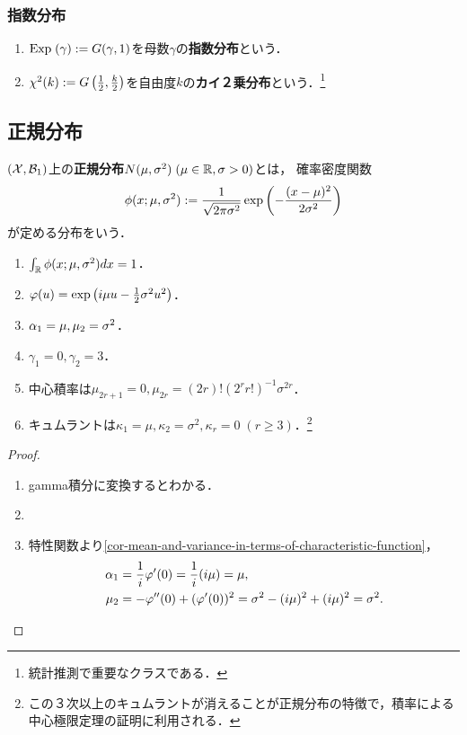 \documentclass[uplatex,dvipdfmx]{jsreport}
\begin{document}
\subsubsection{指数分布}

\begin{definition}\mbox{}
    \begin{enumerate}
        \item $\mathrm{Exp}\;(\gamma):=G(\gamma,1)$を母数$\gamma$の\textbf{指数分布}という．
        \item $\chi^2(k):=G\left(\frac{1}{2},\frac{k}{2}\right)$を自由度$k$の\textbf{カイ２乗分布}という．\footnote{統計推測で重要なクラスである．}
    \end{enumerate}
\end{definition}

\subsection{正規分布}

\begin{definition}
    $(\mathcal{X},\mathcal{B}_1)$上の\textbf{正規分布}$N(\mu,\sigma^2)\;(\mu\in\mathbb{R},\sigma>0)$とは，
    確率密度関数
    \[\phi(x;\mu,\sigma^2):=\frac{1}{\sqrt{2\pi\sigma^2}}\exp\left(-\frac{(x-\mu)^2}{2\sigma^2}\right)\]
    が定める分布をいう．
\end{definition}

\begin{proposition}\mbox{}
    \begin{enumerate}
        \item $\int_{\mathbb{R}}\phi(x;\mu,\sigma^2)dx=1$．
        \item $\varphi(u)=\exp\left(i\mu u-\frac{1}{2}\sigma^2u^2\right)$．
        \item $\alpha_1=\mu,\mu_2=\sigma^2$．
        \item $\gamma_1=0,\gamma_2=3$．
        \item 中心積率は$\mu_{2r+1}=0,\mu_{2r}=(2r)!(2^rr!)^{-1}\sigma^{2r}$．
        \item キュムラントは$\kappa_1=\mu,\kappa_2=\sigma^2,\kappa_r=0\;(r\ge 3)$．\footnote{この３次以上のキュムラントが消えることが正規分布の特徴で，積率による中心極限定理の証明に利用される．}
    \end{enumerate}
\end{proposition}
\begin{proof}\mbox{}
    \begin{enumerate}
        \item gamma積分に変換するとわかる．
        \item 
        \item 特性関数より\ref{cor-mean-and-variance-in-terms-of-characteristic-function}，
        \begin{align*}
            \alpha_1&=\frac{1}{i}\varphi'(0)=\frac{1}{i}(i\mu)=\mu,\\
            \mu_2&=-\varphi''(0)+(\varphi'(0))^2=\sigma^2-(i\mu)^2+(i\mu)^2=\sigma^2.
        \end{align*}
    \end{enumerate}
\end{proof}
\end{document}
